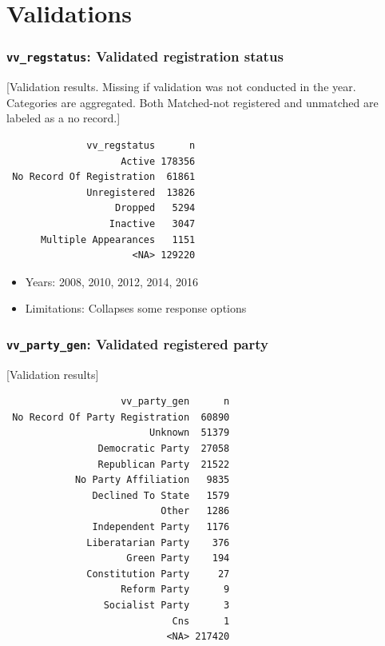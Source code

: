 \documentclass[10pt,article,oneside]{memoir}
\theoremstyle{definition}
\begin{document}
\newpage

\section{Validations}\label{validations}

\subsubsection{\texorpdfstring{\texttt{vv\_regstatus}: Validated
registration
status}{vv\_regstatus: Validated registration status}}\label{vv_regstatus-validated-registration-status}

{[}Validation results. Missing if validation was not conducted in the
year. Categories are aggregated. Both Matched-not registered and
unmatched are labeled as a no record.{]}

\begin{verbatim}
              vv_regstatus      n
                    Active 178356
 No Record Of Registration  61861
              Unregistered  13826
                   Dropped   5294
                  Inactive   3047
      Multiple Appearances   1151
                      <NA> 129220
\end{verbatim}

\begin{itemize}
\tightlist
\item
  Years: 2008, 2010, 2012, 2014, 2016
\item
  Limitations: Collapses some response options
\end{itemize}

\subsubsection{\texorpdfstring{\texttt{vv\_party\_gen}: Validated
registered
party}{vv\_party\_gen: Validated registered party}}\label{vv_party_gen-validated-registered-party}

{[}Validation results{]}

\begin{verbatim}
                    vv_party_gen      n
 No Record Of Party Registration  60890
                         Unknown  51379
                Democratic Party  27058
                Republican Party  21522
            No Party Affiliation   9835
               Declined To State   1579
                           Other   1286
               Independent Party   1176
              Liberatarian Party    376
                     Green Party    194
              Constitution Party     27
                    Reform Party      9
                 Socialist Party      3
                             Cns      1
                            <NA> 217420
\end{verbatim}
\end{document}
